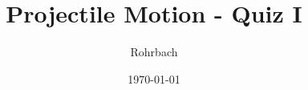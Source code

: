 \documentclass[10pt]{exam}
\title{Projectile Motion - Quiz I}
\author{Rohrbach}
\date{\today}
\begin{document}
\maketitle

\def\vo{2.1}
\def\yo{5.2}

\end{document}
